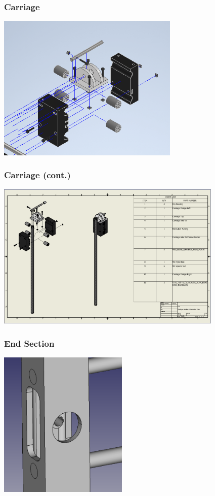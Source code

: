 \documentclass[aspectratio=169]{beamer}
\begin{document}
\begin{frame}
    \frametitle{Carriage}

    \includegraphics[height=7cm]{closeup1}
\end{frame}

\begin{frame}
    \frametitle{Carriage (cont.)}

    \includegraphics[height=7cm]{closeup2}
\end{frame}

\begin{frame}
    \frametitle{End Section}

    \includegraphics[height=7cm]{closeup3}
\end{frame}
\end{document}
